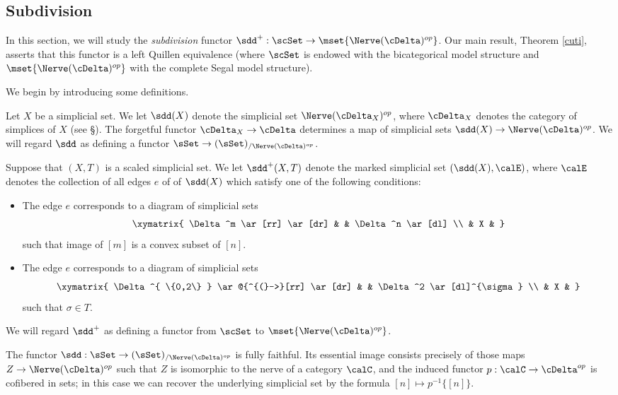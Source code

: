 \subsection{Subdivision}\label{subber}\label{bisec4.3}

In this section, we will study the {\it subdivision} functor
$\sdd^{+}: \scSet \rightarrow \mset{ \Nerve(\cDelta)^{op} }$. 
Our main result, Theorem \ref{cuti}, asserts that this functor is a left Quillen
equivalence (where $\scSet$ is endowed with the bicategorical model structure
and $\mset{ \Nerve(\cDelta)^{op}}$ with the complete Segal model structure).

We begin by introducing some definitions.

\begin{definition}\label{conf}
Let $X$ be a simplicial set. We let $\sdd(X)$ denote the simplicial set
$\Nerve( \cDelta_{X})^{op}$, where $\cDelta_{X}$ denotes the category of simplices of
$X$ (see \S {}). The forgetful functor $\cDelta_{X} \rightarrow \cDelta$
determines a map of simplicial sets $\sdd(X) \rightarrow \Nerve(\cDelta)^{op}$. 
We will regard $\sdd$ as defining a functor $\sSet \rightarrow (\sSet)_{ / \Nerve(\cDelta)^{op} }$.

Suppose that $(X, T)$ is a scaled simplicial set. We let $\sdd^{+}(X,T)$ denote the
marked simplicial set $( \sdd(X), \calE)$, where $\calE$ denotes the collection of all edges $e$ of
of $\sdd(X)$ which satisfy one of the following conditions:
\begin{itemize}
\item[$(a)$] The edge $e$ corresponds to a diagram of simplicial sets
$$ \xymatrix{ \Delta^m \ar[rr] \ar[dr] & & \Delta^n \ar[dl] \\
& X & }$$
such that image of $[m]$ is a convex subset of $[n]$.
\item[$(b)$] The edge $e$ corresponds to a diagram of simplicial sets
$$ \xymatrix{ \Delta^{ \{0,2\} } \ar@{^{(}->}[rr] \ar[dr] & & \Delta^2 \ar[dl]^{\sigma} \\
& X & }$$
such that $\sigma \in T$. 
\end{itemize}
We will regard $\sdd^{+}$ as defining a functor from $\scSet$ to $\mset{ \Nerve(\cDelta)^{op} }$.
\end{definition}

\begin{remark}
The functor $\sdd: \sSet \rightarrow ( \sSet)_{/ \Nerve(\cDelta)^{op} }$ is fully faithful.
Its essential image consists precisely of those maps $Z \rightarrow \Nerve( \cDelta)^{op}$ such
that $Z$ is isomorphic to the nerve of a category $\calC$, and the induced functor
$p: \calC \rightarrow \cDelta^{op}$ is cofibered in sets; in this case we can recover 
the underlying simplicial set by the formula $[n] \mapsto p^{-1} \{ [n] \}$. 
\end{remark}

